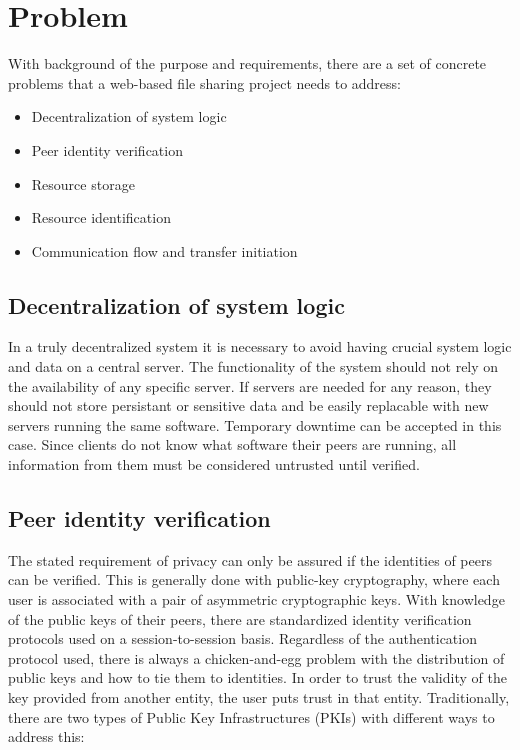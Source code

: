\section{Problem}
\label{sec:problem}

With background of the purpose and requirements, there are a set of concrete problems that a web-based file sharing project needs to address:

\begin{itemize}
\item Decentralization of system logic
\item Peer identity verification
\item Resource storage
\item Resource identification
\item Communication flow and transfer initiation
\end{itemize}

\subsection{Decentralization of system logic}
In a truly decentralized system it is necessary to avoid having crucial system logic and data on a central server. The functionality of the system should not rely on the availability of any specific server. If servers are needed for any reason, they should not store persistant or sensitive data and be easily replacable with new servers running the same software. Temporary downtime can be accepted in this case. Since clients do not know what software their peers are running, all information from them must be considered untrusted until verified.

\subsection{Peer identity verification}
The stated requirement of privacy can only be assured if the identities of peers can be verified. This is generally done with public-key cryptography, where each user is associated with a pair of asymmetric cryptographic keys. With knowledge of the public keys of their peers, there are standardized identity verification protocols used on a session-to-session basis. Regardless of the authentication protocol used, there is always a chicken-and-egg problem with the distribution of public keys and how to tie them to identities. In order to trust the validity of the key provided from another entity, the user puts trust in that entity. Traditionally, there are two types of Public Key Infrastructures (PKIs) with different ways to address this:

